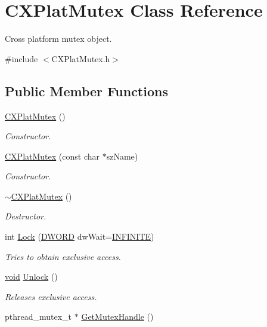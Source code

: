 \hypertarget{class_c_x_plat_mutex}{\section{\-C\-X\-Plat\-Mutex \-Class \-Reference}
\label{class_c_x_plat_mutex}
}


\-Cross platform mutex object.  




{\ttfamily \#include $<$\-C\-X\-Plat\-Mutex.\-h$>$}

\subsection*{\-Public \-Member \-Functions}
\begin{DoxyCompactItemize}
\item 
\hyperlink{class_c_x_plat_mutex_a8332df2263138802a93821050fa291da}{\-C\-X\-Plat\-Mutex} ()
\begin{DoxyCompactList}\small\item\em \-Constructor. \end{DoxyCompactList}\item 
\hyperlink{class_c_x_plat_mutex_a322aa88927a73451cead6578eced7bf7}{\-C\-X\-Plat\-Mutex} (const char $\ast$sz\-Name)
\begin{DoxyCompactList}\small\item\em \-Constructor. \end{DoxyCompactList}\item 
\hyperlink{class_c_x_plat_mutex_a5b79959df48857967cb97fabc3c3bf1c}{$\sim$\-C\-X\-Plat\-Mutex} ()
\begin{DoxyCompactList}\small\item\em \-Destructor. \end{DoxyCompactList}\item 
int \hyperlink{class_c_x_plat_mutex_aaf22a9ff69812daf8008996f33590e56}{\-Lock} (\hyperlink{_x_plat_8h_aa39b39d94407451a6ec0226479db68cf}{\-D\-W\-O\-R\-D} dw\-Wait=\hyperlink{_x_plat_8h_aa84a29002ab81c719c0d07bb446296e0}{\-I\-N\-F\-I\-N\-I\-T\-E})
\begin{DoxyCompactList}\small\item\em \-Tries to obtain exclusive access. \end{DoxyCompactList}\item 
\hyperlink{_cpclient_8h_a6464f7480a0fd0ee170cba12b2c0497f}{void} \hyperlink{class_c_x_plat_mutex_a58115a16e78ebf02687e12a7ea6efdaf}{\-Unlock} ()
\begin{DoxyCompactList}\small\item\em \-Releases exclusive access. \end{DoxyCompactList}\item 
pthread\-\_\-mutex\-\_\-t $\ast$ \hyperlink{class_c_x_plat_mutex_a4f0d2a498add4247bf15b8ee754e0b44}{\-Get\-Mutex\-Handle} ()
\end{DoxyCompactItemize}
